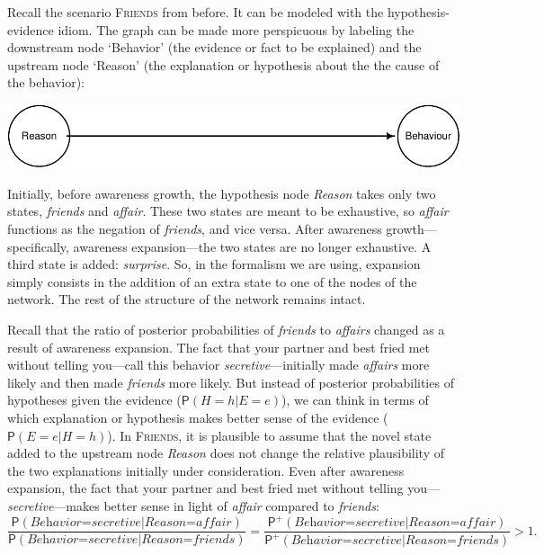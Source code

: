 \documentclass[
  11pt,
  dvipsnames,enabledeprecatedfontcommands]{scrartcl}
\newcommand{\pr}[1]{\ensuremath{\mathsf{P}(#1)}}
\newcommand{\ppr}[2]{\ensuremath{\mathsf{P}^{#1}(#2)}}
\begin{document}
Recall the scenario \textsc{Friends} from before. It can be modeled with
the hypothesis-evidence idiom. The graph can be made more perspicuous by
labeling the downstream node `Behavior' (the evidence or fact to be
explained) and the upstream node `Reason' (the explanation or hypothesis
about the the cause of the behavior):

\begin{center}\includegraphics[width=0.5\linewidth,height=0.5\textheight]{ReplyToSteeleStefansson5_files/figure-latex/friendsDAG-1} \end{center}

\noindent Initially, before awareness growth, the hypothesis node
\textit{Reason} takes only two states, \textit{friends} and
\textit{affair}. These two states are meant to be exhaustive, so
\textit{affair} functions as the negation of \textit{friends}, and vice
versa. After awareness growth---specifically, awareness expansion---the
two states are no longer exhaustive. A third state is added:
\textit{surprise}. So, in the formalism we are using, expansion simply
consists in the addition of an extra state to one of the nodes of the
network. The rest of the structure of the network remains intact.

Recall that the ratio of posterior probabilities of \textit{friends} to
\textit{affairs} changed as a result of awareness expansion. The fact
that your partner and best fried met without telling you---call this
behavior \textit{secretive}---initially made \textit{affairs} more
likely and then made \textit{friends} more likely. But instead of
posterior probabilities of hypotheses given the evidence
(\(\pr{H=h \vert E=e}\)), we can think in terms of which explanation or
hypothesis makes better sense of the evidence (\(\pr{E=e \vert H=h}\)).
In \textsc{Friends}, it is plausible to assume that the novel state
added to the upstream node \textit{Reason} does not change the relative
plausibility of the two explanations initially under consideration. Even
after awareness expansion, the fact that your partner and best fried met
without telling you---\textit{secretive}---makes better sense in light
of \textit{affair} compared to \textit{friends}:
\[\frac{\pr{\textit{Behavior=secretive} \vert \textit{Reason=affair}}}{\pr{\textit{Behavior=secretive} \vert  \textit{Reason=friends}}} = \frac{\ppr{+}{\textit{Behavior=secretive} \vert \textit{Reason=affair}}}{\ppr{+}{\textit{Behavior=secretive} \vert \textit{Reason=friends}}}>1. \]
\end{document}

